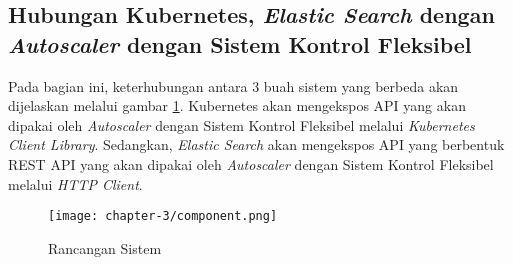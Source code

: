 \subsection{Hubungan Kubernetes, \textit{Elastic Search} dengan \textit{Autoscaler} dengan Sistem Kontrol Fleksibel}

Pada bagian ini, keterhubungan antara 3 buah sistem yang berbeda akan dijelaskan melalui gambar \ref{fig:rancangan-sistem}. Kubernetes akan mengekspos API yang akan dipakai oleh \textit{Autoscaler} dengan Sistem Kontrol Fleksibel melalui \textit{Kubernetes Client Library}. Sedangkan, \textit{Elastic Search} akan mengekspos API yang berbentuk REST API yang akan dipakai oleh \textit{Autoscaler} dengan Sistem Kontrol Fleksibel melalui \textit{HTTP Client}.

\begin{figure}[h]
    \centering
    \texttt{[image: chapter-3/component.png]}
    \caption{Rancangan Sistem}
    \label{fig:rancangan-sistem}
\end{figure}